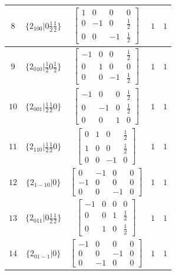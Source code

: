 \documentclass[fleqn,8pt]{jsarticle}
\begin{document}
\begin{longtable}{ccccc}
$ 8 $ & $ \{2{}_{100}|0 \frac{1}{2} \frac{1}{2}\} $ & $ \begin{bmatrix} 1 & 0 & 0 & 0 \\ 0 & -1 & 0 & \frac{1}{2} \\ 0 & 0 & -1 & \frac{1}{2} \end{bmatrix} $ & $ 1 $ & $ 1 $ \\ \hline
$ 9 $ & $ \{2{}_{010}|\frac{1}{2} 0 \frac{1}{2}\} $ & $ \begin{bmatrix} -1 & 0 & 0 & \frac{1}{2} \\ 0 & 1 & 0 & 0 \\ 0 & 0 & -1 & \frac{1}{2} \end{bmatrix} $ & $ 1 $ & $ 1 $ \\ \hline
$ 10 $ & $ \{2{}_{001}|\frac{1}{2} \frac{1}{2} 0\} $ & $ \begin{bmatrix} -1 & 0 & 0 & \frac{1}{2} \\ 0 & -1 & 0 & \frac{1}{2} \\ 0 & 0 & 1 & 0 \end{bmatrix} $ & $ 1 $ & $ 1 $ \\ \hline
$ 11 $ & $ \{2{}_{110}|\frac{1}{2} \frac{1}{2} 0\} $ & $ \begin{bmatrix} 0 & 1 & 0 & \frac{1}{2} \\ 1 & 0 & 0 & \frac{1}{2} \\ 0 & 0 & -1 & 0 \end{bmatrix} $ & $ 1 $ & $ 1 $ \\ \hline
$ 12 $ & $ \{2{}_{1-10}|0\} $ & $ \begin{bmatrix} 0 & -1 & 0 & 0 \\ -1 & 0 & 0 & 0 \\ 0 & 0 & -1 & 0 \end{bmatrix} $ & $ 1 $ & $ 1 $ \\ \hline
$ 13 $ & $ \{2{}_{011}|0 \frac{1}{2} \frac{1}{2}\} $ & $ \begin{bmatrix} -1 & 0 & 0 & 0 \\ 0 & 0 & 1 & \frac{1}{2} \\ 0 & 1 & 0 & \frac{1}{2} \end{bmatrix} $ & $ 1 $ & $ 1 $ \\ \hline
$ 14 $ & $ \{2{}_{01-1}|0\} $ & $ \begin{bmatrix} -1 & 0 & 0 & 0 \\ 0 & 0 & -1 & 0 \\ 0 & -1 & 0 & 0 \end{bmatrix} $ & $ 1 $ & $ 1 $ \\ \hline

\end{longtable}
\end{document}
